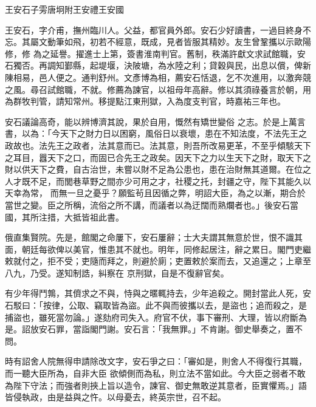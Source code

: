 
\begin{pinyinscope}

 王安石子雱唐坰附王安禮王安國



 王安石，字介甫，撫州臨川人。父益，都官員外郎。安石少好讀書，一過目終身不忘。其屬文動筆如飛，初若不經意，既成，見者皆服其精妙。友生曾鞏攜以示歐陽修，修
 為之延譽。擢進士上第，簽書淮南判官。舊制，秩滿許獻文求試館職，安石獨否。再調知鄞縣，起堤堰，決陂塘，為水陸之利；貸穀與民，出息以償，俾新陳相易，邑人便之。通判舒州。文彥博為相，薦安石恬退，乞不次進用，以激奔競之風。尋召試館職，不就。修薦為諫官，以祖母年高辭。修以其須祿養言於朝，用為群牧判管，請知常州。移提點江東刑獄，入為度支判官，時嘉祐三年也。



 安石議論高奇，能以辨博濟其說，果於自用，慨然有矯世變俗
 之志。於是上萬言書，以為：「今天下之財力日以困窮，風俗日以衰壞，患在不知法度，不法先王之政故也。法先王之政者，法其意而已。法其意，則吾所改易更革，不至乎傾駭天下之耳目，囂天下之口，而固已合先王之政矣。因天下之力以生天下之財，取天下之財以供天下之費，自古治世，未嘗以財不足為公患也，患在治財無其道爾。在位之人才既不足，而閭巷草野之間亦少可用之才，社稷之托，封疆之守，陛下其能久以天幸為常，
 而無一旦之憂乎？願監茍且因循之弊，明詔大臣，為之以漸，期合於當世之變。臣之所稱，流俗之所不講，而議者以為迂闊而熟爛者也。」後安石當國，其所注措，大抵皆祖此書。



 俄直集賢院。先是，館閣之命屢下，安石屢辭；士大夫謂其無意於世，恨不識其面，朝廷每欲俾以美官，惟患其不就也。明年，同修起居注，辭之累日。閣門吏繼敕就付之，拒不受；吏隨而拜之，則避於廁；吏置敕於案而去，又追還之；上章至八九，乃受。遂知制誥，糾察在
 京刑獄，自是不復辭官矣。



 有少年得鬥鶉，其儕求之不與，恃與之暱輒持去，少年追殺之。開封當此人死，安石駁曰：「按律，公取、竊取皆為盜。此不與而彼攜以去，是盜也；追而殺之，是捕盜也，雖死當勿論。」遂劾府司失入。府官不伏，事下審刑、大理，皆以府斷為是。詔放安石罪，當詣閣門謝。安石言：「我無罪。」不肯謝。御史舉奏之，置不問。



 時有詔舍人院無得申請除改文字，安石爭之曰：「審如是，則舍人不得復行其職，而一聽大臣所為，自非大臣
 欲傾側而為私，則立法不當如此。今大臣之弱者不敢為陛下守法；而強者則挾上旨以造令，諫官、御史無敢逆其意者，臣實懼焉。」語皆侵執政，由是益與之忤。以母憂去，終英宗世，召不起。




\end{pinyinscope}
